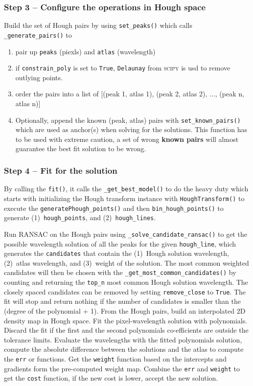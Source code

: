 \documentclass{aa}
\begin{document}
\subsubsection*{Step 3 -- Configure the operations in Hough space}
Build the set of Hough pairs by using \texttt{set\_peaks()} which calls \texttt{\_generate\_pairs()} to
\begin{enumerate}
    \item pair up \texttt{peaks} (piexls) and \texttt{atlas} (wavelength)
    \item if \texttt{constrain\_poly} is set to \texttt{True}, \texttt{Delaunay} from \textsc{scipy} is usd to remove outlying points.
    \item order the pairs into a list of [(peak 1, atlas 1), (peak 2, atlas 2), ..., (peak n, atlas n)]
    \item Optionally, append the known (peak, atlas) pairs with \texttt{set\_known\_pairs()} which are used as anchor(s) when solving for the solutions. This function has to be used with extreme caution, a set of wrong \textbf{known pairs} will almost guarantee the best fit solution to be wrong.
\end{enumerate}

\subsubsection*{Step 4 -- Fit for the solution}
By calling the \texttt{fit()}, it calls the \texttt{\_get\_best\_model()} to do the heavy duty which starts with initializing the Hough transform instance with \texttt{HoughTransform()} to execute the \texttt{generatePhough\_points()} and then \texttt{bin\_hough\_points()} to generate (1)~\texttt{hough\_points}, and (2)~\texttt{hough\_lines}.

Run RANSAC on the Hough pairs using \texttt{\_solve\_candidate\_ransac()} to get the possible wavelength solution of all the peaks for the given \texttt{hough\_line}, which generates the \texttt{candidates} that contain the (1)~Hough solution wavelength, (2)~atlas wavelength, and (3)~weight of the solution. The most common weighted candidates will then be chosen with the \texttt{\_get\_most\_common\_candidates()} by counting and returning the \texttt{top\_n} most common Hough solution wavelength. The closely spaced candidates can be removed by setting \texttt{remove\_close} to \texttt{True}. The fit will stop and return nothing if the number of candidates is smaller than the (degree of the polynomial + 1). From the Hough pairs, build an interpolated 2D density map in Hough space. Fit the pixel-wavelength solution with polynomials. Discard the fit if the first and the second polynomials co-efficients are outside the tolerance limits. Evaluate the wavelengths with the fitted polynomials solution, compute the absolute difference between the solutions and the atlas to compute the \texttt{err} or functions. Get the \texttt{weight} function based on the intercepts and gradients form the pre-computed weight map. Combine the \texttt{err} and \texttt{weight} to get the \texttt{cost} function, if the new cost is lower, accept the new solution.
\end{document}
